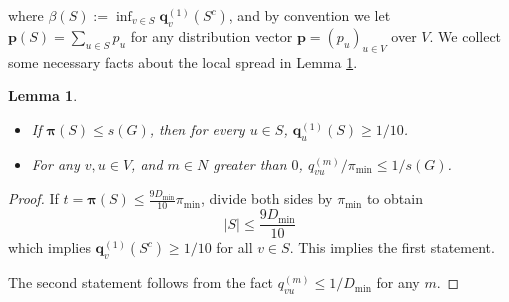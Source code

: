 \documentclass{article}
\newcommand{\set}[1]{\left\{#1\right\}}
\newcommand{\abs}[1]{\left \lvert #1 \right \rvert}
\newcommand{\1}{\mathbf{1}}
\newcommand{\pbf}{\mathbf{p}}
\newcommand{\qbf}{\mathbf{q}}
\newcommand{\pibf}{\bm{\pi}}
\theoremstyle{aldenthm}
\newtheorem{lemma}{Lemma}
\begin{document}
where $\beta(S) := \inf_{v \in S} \qbf_{v}^{(1)}(S^c)$, and by convention we let $\pbf(S) = \sum_{u \in S} p_u$ for any distribution vector $\pbf = (p_u)_{u \in V}$ over $V$. We collect some necessary facts about the local spread in Lemma \ref{lem: local_spread_G}.
\begin{lemma}
	\label{lem: local_spread_G}
	\begin{itemize}
		\item If $\pibf(S) \leq s(G)$, then for every $u \in S$, $\qbf_u^{(1)}(S) \geq 1/10$.
		\item For any $v, u \in V$, and $m \in N$ greater than $0$, $q_{vu}^{(m)}/ \pi_{\min} \leq 1/s(G)$.
	\end{itemize}
	
\end{lemma}

\begin{proof}
	If $t = \pibf(S) \leq \frac{9 D_{\min}}{10} \pi_{\min}$, divide both sides by $\pi_{\min}$ to obtain
	\begin{equation*}
	\abs{S} \leq \frac{9 D_{\min}}{10}
	\end{equation*}
	which implies $\qbf_{v}^{(1)}(S^c) \geq 1/10$ for all $v \in S$. This implies the first statement.
	
	The second statement follows from the fact $q_{vu}^{(m)} \leq 1/D_{\min}$ for any $m$.
\end{proof}
\end{document}
